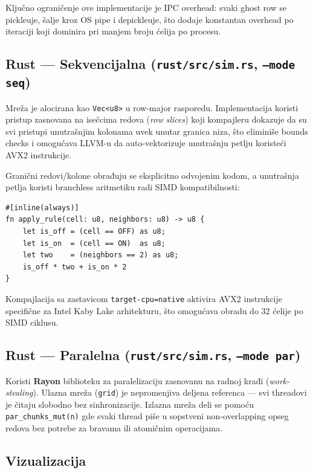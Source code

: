 \documentclass[12pt,a4paper]{article}
\begin{document}
Ključno ograničenje ove implementacije je IPC overhead: svaki ghost row se pickleuje, šalje
kroz OS pipe i depickleuje, što dodaje konstantan overhead po iteraciji koji dominira pri
manjem broju ćelija po procesu.

\subsection{Rust --- Sekvencijalna (\texttt{rust/src/sim.rs}, \texttt{--mode seq})}

Mreža je alocirana kao \texttt{Vec<u8>} u row-major rasporedu.
Implementacija koristi pristup zasnovana na isečcima redova (\emph{row slices}) koji kompajleru
dokazuje da su svi pristupi unutrašnjim kolonama uvek unutar granica niza, što eliminiše
bounds checks i omogućava LLVM-u da auto-vektorizuje unutrašnju petlju koristeći AVX2 instrukcije.

Granični redovi/kolone obrađuju se eksplicitno odvojenim kodom, a unutrašnja petlja koristi
branchless aritmetiku radi SIMD kompatibilnosti:

\begin{lstlisting}
#[inline(always)]
fn apply_rule(cell: u8, neighbors: u8) -> u8 {
    let is_off = (cell == OFF) as u8;
    let is_on  = (cell == ON)  as u8;
    let two    = (neighbors == 2) as u8;
    is_off * two + is_on * 2
}
\end{lstlisting}

Kompajlacija sa zastavicom \texttt{target-cpu=native} aktivira AVX2 instrukcije specifične za
Intel Kaby Lake arhitekturu, što omogućava obradu do 32 ćelije po SIMD ciklusu.

\subsection{Rust --- Paralelna (\texttt{rust/src/sim.rs}, \texttt{--mode par})}

Koristi \textbf{Rayon} biblioteku za paralelizaciju zasnovanu na radnoj krađi (\emph{work-stealing}).
Ulazna mreža (\texttt{grid}) je nepromenjiva deljena referenca --- svi threadovi je čitaju slobodno
bez sinhronizacije. Izlazna mreža deli se pomoću \texttt{par\_chunks\_mut(n)} gde svaki thread
piše u sopstveni non-overlapping opseg redova bez potrebe za bravama ili atomičnim operacijama.

\subsection{Vizualizacija}
\end{document}
